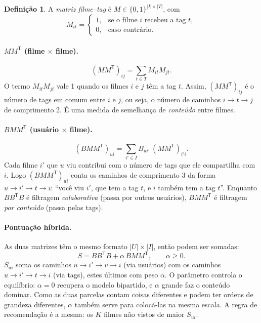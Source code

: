 \documentclass[12pt,a4paper]{article}
\theoremstyle{definition}
\newtheorem{definicao}{Definição}
\begin{document}
\begin{definicao}
A \emph{matriz filme--tag} é $M \in \{0,1\}^{|I| \times |T|}$, com
\[
  M_{it} =
  \begin{cases}
    1, & \text{se o filme } i \text{ recebeu a tag } t,\\
    0, & \text{caso contrário.}
  \end{cases}
\]
\end{definicao}


\paragraph{$MM^{\mathsf T}$ (filme $\times$ filme).}
\[
  (MM^{\mathsf T})_{ij} = \sum_{t \in T} M_{it} M_{jt}.
\]
O termo $M_{it}M_{jt}$ vale 1 quando os filmes $i$ e $j$ têm a tag $t$.
Assim, $(MM^{\mathsf T})_{ij}$ é o número de tags em comum entre $i$ e $j$,
ou seja, o número de caminhos $i \to t \to j$ de comprimento 2. É uma
medida de semelhança de \emph{conteúdo} entre filmes.

\paragraph{$BMM^{\mathsf T}$ (usuário $\times$ filme).}
\[
  (BMM^{\mathsf T})_{ui} = \sum_{i' \in I} B_{ui'}\,(MM^{\mathsf T})_{i'i}.
\]
Cada filme $i'$ que $u$ viu contribui com o número de tags que ele
compartilha com $i$. Logo $(BMM^{\mathsf T})_{ui}$ conta os caminhos de
comprimento 3 da forma $u \to i' \to t \to i$: ``você viu $i'$, que tem a
tag $t$, e $i$ também tem a tag $t$''. Enquanto $BB^{\mathsf T}B$ é
filtragem \emph{colaborativa} (passa por outros usuários),
$BMM^{\mathsf T}$ é filtragem \emph{por conteúdo} (passa pelas tags).

\paragraph{Pontuação híbrida.}
As duas matrizes têm o mesmo formato $|U| \times |I|$, então podem ser
somadas:
\[
  S = BB^{\mathsf T}B + \alpha\, BMM^{\mathsf T}, \qquad \alpha \geq 0.
\]
$S_{ui}$ soma os caminhos $u \to i' \to v \to i$ (via usuários) com os
caminhos $u \to i' \to t \to i$ (via tags), estes últimos com peso
$\alpha$. O parâmetro controla o equilíbrio: $\alpha = 0$ recupera o
modelo bipartido, e $\alpha$ grande faz o conteúdo dominar. Como as duas
parcelas contam coisas diferentes e podem ter ordens de grandeza
diferentes, $\alpha$ também serve para colocá-las na mesma escala. A regra
de recomendação é a mesma: os $K$ filmes não vistos de maior $S_{ui}$.
\end{document}
